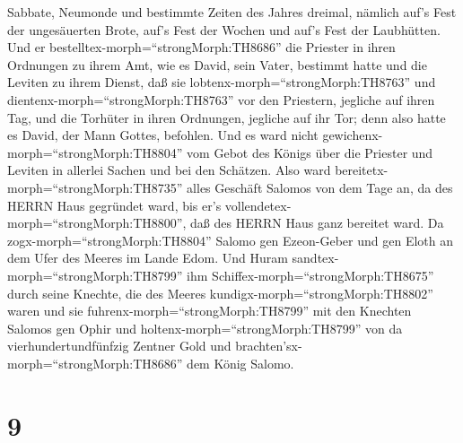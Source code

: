 Sabbate, Neumonde und bestimmte Zeiten des Jahres dreimal, nämlich auf's
Fest der ungesäuerten Brote, auf's Fest der Wochen und auf's Fest der
Laubhütten.  Und er bestelltex-morph=``strongMorph:TH8686''
die Priester in ihren Ordnungen zu ihrem Amt, wie es David, sein Vater,
bestimmt hatte und die Leviten zu ihrem Dienst, daß sie
lobtenx-morph=``strongMorph:TH8763'' und
dientenx-morph=``strongMorph:TH8763'' vor den Priestern, jegliche auf
ihren Tag, und die Torhüter in ihren Ordnungen, jegliche auf ihr Tor;
denn also hatte es David, der Mann Gottes, befohlen.  Und
es ward nicht gewichenx-morph=``strongMorph:TH8804'' vom Gebot des
Königs über die Priester und Leviten in allerlei Sachen und bei den
Schätzen.  Also ward bereitetx-morph=``strongMorph:TH8735''
alles Geschäft Salomos von dem Tage an, da des HERRN Haus gegründet
ward, bis er's vollendetex-morph=``strongMorph:TH8800'', daß des HERRN
Haus ganz bereitet ward.  Da
zogx-morph=``strongMorph:TH8804'' Salomo gen Ezeon-Geber und gen Eloth
an dem Ufer des Meeres im Lande Edom.  Und Huram
sandtex-morph=``strongMorph:TH8799'' ihm
Schiffex-morph=``strongMorph:TH8675'' durch seine Knechte, die des
Meeres kundigx-morph=``strongMorph:TH8802'' waren und sie
fuhrenx-morph=``strongMorph:TH8799'' mit den Knechten Salomos gen Ophir
und holtenx-morph=``strongMorph:TH8799'' von da vierhundertundfünfzig
Zentner Gold und brachten'sx-morph=``strongMorph:TH8686'' dem König
Salomo.

\hypertarget{section-8}{%
\section{9}\label{section-8}}


